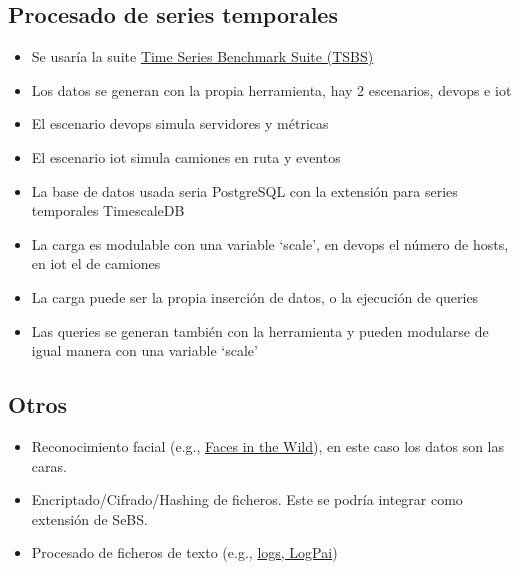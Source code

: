 \documentclass[preprint,3p]{elsarticle}
\begin{document}
\subsection{Procesado de series temporales}

\begin{itemize}
	\item Se usaría la suite \href{https://github.com/timescale/tsbs}{Time Series Benchmark Suite (TSBS)}
	\item Los datos se generan con la propia herramienta, hay 2 escenarios, devops e iot
	\item El escenario devops simula servidores y métricas
	\item El escenario iot simula camiones en ruta y eventos
	\item La base de datos usada seria PostgreSQL con la extensión para series temporales TimescaleDB
	\item La carga es modulable con una variable `scale', en devops el número de hosts, en iot el de camiones
	\item La carga puede ser la propia inserción de datos, o la ejecución de queries
	\item Las queries se generan también con la herramienta y pueden modularse de igual manera con una variable `scale'
\end{itemize}


\subsection{Otros}
\begin{itemize}
		
	\item Reconocimiento facial (e.g., \href{http://vis-www.cs.umass.edu/lfw/}{Faces in the Wild}), en este caso los datos son las caras.
	
	\item Encriptado/Cifrado/Hashing de ficheros. Este se podría integrar como extensión de SeBS.
	
	\item Procesado de ficheros de texto (e.g., \href{https://github.com/logpai}{logs, LogPai})
	
\end{itemize}
\end{document}
